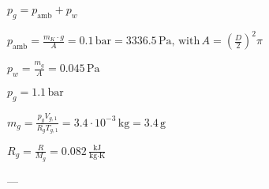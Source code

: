 \( p_g = p_{\text{amb}} + p_w \)  

\( p_{\text{amb}} = \frac{m_K \cdot g}{A} = 0.1 \, \text{bar} = 3336.5 \, \text{Pa}, \, \text{with} \, A = \left(\frac{D}{2}\right)^2 \pi \)  

\( p_w = \frac{m_g}{A} = 0.045 \, \text{Pa} \)  

\( p_g = 1.1 \, \text{bar} \)  

\( m_g = \frac{p_g V_{g,1}}{R_g T_{g,1}} = 3.4 \cdot 10^{-3} \, \text{kg} = 3.4 \, \text{g} \)  

\( R_g = \frac{R}{M_g} = 0.082 \, \frac{\text{kJ}}{\text{kg·K}} \)  

---